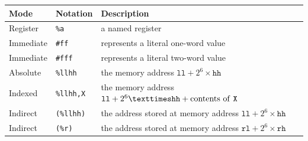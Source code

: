 \documentclass[a4paper,onecolumn,final,10pt]{memoir}
\let\ttt\texttt
\begin{document}

\begin{center}
	\begin{tabular}{|l|l|l|}
		\hline
		\textbf{Mode} & \textbf{Notation}                       & \textbf{Description}                                                    \\ \hline
		Register      & \ttt{\%a}                               & a named register                                                        \\ \hline
		Immediate     & \ttt{\#ff}                              & represents a literal one-word value                                     \\ \hline
		Immediate     & \ttt{\#fff}                             & represents a literal two-word value                                     \\ \hline
		Absolute      & \ttt{\%llhh}                            & the memory address $\ttt{ll}+2^6×\ttt{hh}$                              \\ \hline
		Indexed       & \ttt{\%llhh,X}                          & the memory address $\ttt{ll}+2^6×\ttt{hh}+\textrm{contents of \ttt{X}}$ \\ \hline
		Indirect      & \hspace{-0.2em}\ttt{(\%llhh)}           & the address stored at memory address $\ttt{ll}+2^6×\ttt{hh}$            \\ \hline
		Indirect      & \hspace{-0.2em}\ttt{(\%r)}\footnotemark & the address stored at memory address $\ttt{rl}+2^6×\ttt{rh}$            \\ \hline
	\end{tabular}
\end{center}
\end{document}
